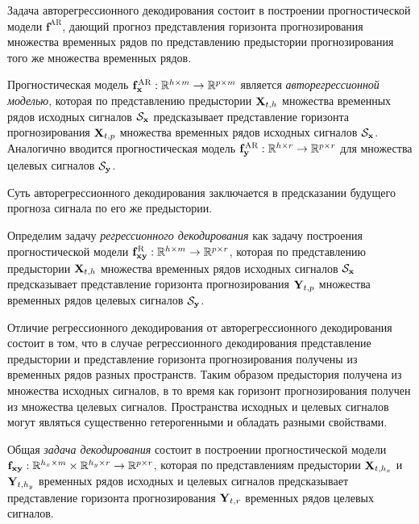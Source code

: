 Задача авторегрессионного декодирования состоит в построении прогностической модели $\mathbf{f}^{\text{AR}}$, дающий прогноз представления горизонта прогнозирования множества временных рядов по представлению предыстории прогнозирования того же множества временных рядов.

\begin{definition}
	\label{ch1:def:autoreg_model}
	Прогностическая модель $\mathbf{f}^{\text{AR}}_{\mathbf{x}}: \mathbb{R}^{h \times m} \rightarrow \mathbb{R}^{p \times m}$ является \textit{авторегрессионной моделью}, которая по представлению предыстории $\mathbf{X}_{t,h}$ множества временных рядов исходных сигналов $\mathcal{S}_{\mathbf{x}}$ предсказывает представление горизонта прогнозирования $\mathbf{X}_{t,p}$ множества временных рядов исходных сигналов $\mathcal{S}_{\mathbf{x}}$.
	Аналогично вводится прогностическая модель $\mathbf{f}^{\text{AR}}_{\mathbf{y}}: \mathbb{R}^{h \times r} \rightarrow \mathbb{R}^{p \times r}$ для множества целевых сигналов $\mathcal{S}_{\mathbf{y}}$.
\end{definition}
Суть авторегрессионного декодирования заключается в предсказании будущего прогноза сигнала по его же предыстории.

\begin{definition}
	\label{ch1:def:reg_model}
	Определим задачу \textit{регрессионного декодирования} как задачу построения прогностической модели $\mathbf{f}^{\text{R}}_{\mathbf{x}\mathbf{y}}: \mathbb{R}^{h \times m} \rightarrow \mathbb{R}^{p \times r}$, которая по представлению предыстории $\mathbf{X}_{t,h}$ множества временных рядов исходных сигналов $\mathcal{S}_{\mathbf{x}}$ предсказывает представление горизонта прогнозирования $\mathbf{Y}_{t,p}$ множества временных рядов целевых сигналов $\mathcal{S}_{\mathbf{y}}$.
\end{definition}

Отличие регрессионного декодирования от авторегрессионного декодирования состоит в том, что в случае регрессионного декодирования представление предыстории и представление горизонта прогнозирования получены из временных рядов разных пространств. 
Таким образом предыстория получена из множества исходных сигналов, в то время как горизонт прогнозирования получен из множества целевых сигналов. 
Пространства исходных и целевых сигналов могут являться существенно гетерогенными и обладать разными свойствами.

\begin{definition}
	\label{ch1:def:decode_model}
	Общая \textit{задача декодирования} состоит в построении прогностической модели $\mathbf{f}_{\mathbf{x}\mathbf{y}}: \mathbb{R}^{h_x \times m} \times \mathbb{R}^{h_y \times r} \rightarrow \mathbb{R}^{p \times r}$, которая по представлениям предыстории $\mathbf{X}_{t,h_x}$ и $\mathbf{Y}_{t,h_y}$ временных рядов исходных и целевых сигналов предсказывает представление горизонта прогнозирования $\mathbf{Y}_{t,r}$ временных рядов целевых сигналов. 
\end{definition}

